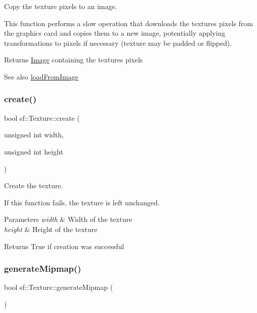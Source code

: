 Copy the texture pixels to an image. 

This function performs a slow operation that downloads the texture\textquotesingle{}s pixels from the graphics card and copies them to a new image, potentially applying transformations to pixels if necessary (texture may be padded or flipped).

\begin{DoxyReturn}{Returns}
\hyperlink{classsf_1_1_image}{Image} containing the texture\textquotesingle{}s pixels
\end{DoxyReturn}
\begin{DoxySeeAlso}{See also}
\hyperlink{classsf_1_1_texture_abec4567ad9856a3596dc74803f26fba2}{load\+From\+Image} 
\end{DoxySeeAlso}
\mbox{\label{classsf_1_1_texture_a89b4c7d204acf1033c3a1b6e0a3ad0a3}} 
\subsubsection{\texorpdfstring{create()}{create()}}
{\footnotesize\ttfamily bool sf\+::\+Texture\+::create (\begin{DoxyParamCaption}\item[{unsigned int}]{width,  }\item[{unsigned int}]{height }\end{DoxyParamCaption})}



Create the texture. 

If this function fails, the texture is left unchanged.


\begin{DoxyParams}{Parameters}
{\em width} & Width of the texture \\
\hline
{\em height} & Height of the texture\\
\hline
\end{DoxyParams}
\begin{DoxyReturn}{Returns}
True if creation was successful 
\end{DoxyReturn}
\mbox{\label{classsf_1_1_texture_a7779a75c0324b5faff77602f871710a9}} 
\subsubsection{\texorpdfstring{generate\+Mipmap()}{generateMipmap()}}
{\footnotesize\ttfamily bool sf\+::\+Texture\+::generate\+Mipmap (\begin{DoxyParamCaption}{ }\end{DoxyParamCaption})}



